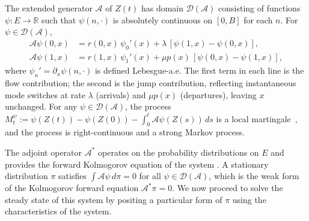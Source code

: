 \documentclass{sig-alternate-per-modified}
\begin{document}
The extended generator $\mathcal{A}$ of $Z(t)$ has domain $\mathcal{D}(\mathcal{A})$
consisting of functions $\psi : E \to \mathbb{R}$ such that $\psi(n,\cdot)$ is absolutely
continuous on $[0,B]$ for each $n$. For $\psi \in \mathcal{D}(\mathcal{A})$,
\begin{subequations}\label{eq:generator}
\begin{align}
  \mathcal{A}\psi(0, x) &= r(0,x)\,\psi_0'(x) + \lambda\,[\psi(1,x) - \psi(0,x)],
  \label{eq:gen0} \\
  \mathcal{A}\psi(1, x) &= r(1,x)\,\psi_1'(x) + \mu p(x)\,[\psi(0,x) - \psi(1,x)],
  \label{eq:gen1}
\end{align}
\end{subequations}
where $\psi_n' = \partial_x \psi(n,\cdot)$ is defined Lebesgue-a.e. The first term in each line is the flow contribution; the second is the jump
contribution, reflecting instantaneous mode switches at rate $\lambda$ (arrivals)
and $\mu p(x)$ (departures), leaving $x$ unchanged. For any
$\psi \in \mathcal{D}(\mathcal{A})$, the process $M_t^\psi := \psi(Z(t)) - \psi(Z(0)) - \int_0^t \mathcal{A}\psi(Z(s))\,ds$
is a local martingale~\cite{Davis1984}, and the process is right-continuous and a strong Markov process.

The adjoint operator $\mathcal{A}^*$ operates on the probability distributions on $E$ and provides the forward Kolmogorov equation of the system \cite{Davis1993}. A stationary distribution $\pi$ satisfies $\int \mathcal{A}\psi\,d\pi = 0$ for all
$\psi \in \mathcal{D}(\mathcal{A})$, which is the weak form of the Kolmogorov forward
equation $\mathcal{A}^*\pi = 0$. We now proceed to solve the steady state of this system by positing a particular form of $\pi$ using the characteristics of the system.
\end{document}
